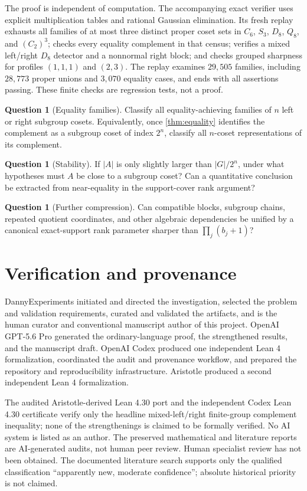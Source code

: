 \documentclass[11pt,a4paper]{amsart}
\theoremstyle{definition}
\newtheorem{question}[theorem]{Question}
\theoremstyle{remark}
\begin{document}
The proof is independent of computation.  The accompanying exact verifier uses
explicit multiplication tables and rational Gaussian elimination.  Its fresh
replay exhausts all families of at most three distinct proper coset sets in
$C_6$, $S_3$, $D_8$, $Q_8$, and $(C_2)^3$; checks every equality complement in
that census; verifies a mixed left/right $D_8$ detector and a nonnormal right
block; and checks grouped sharpness for profiles $(1,1,1)$ and $(2,3)$.  The
replay examines $29{,}505$ families, including $28{,}773$ proper unions and
$3{,}070$ equality cases, and ends with all assertions passing.  These finite
checks are regression tests, not a proof.

\begin{question}[Equality families]
Classify all equality-achieving families of $n$ left or right subgroup cosets.
Equivalently, once \cref{thm:equality} identifies the complement as a subgroup
coset of index $2^n$, classify all $n$-coset representations of its complement.
\end{question}

\begin{question}[Stability]
If $|A|$ is only slightly larger than $|G|/2^n$, under what hypotheses must $A$
be close to a subgroup coset?  Can a quantitative conclusion be extracted from
near-equality in the support-cover rank argument?
\end{question}

\begin{question}[Further compression]
Can compatible blocks, subgroup chains, repeated quotient coordinates, and
other algebraic dependencies be unified by a canonical exact-support rank
parameter sharper than $\prod_j(b_j+1)$?
\end{question}

\section*{Verification and provenance}

DannyExperiments initiated and directed the investigation, selected the problem
and validation requirements, curated and validated the artifacts, and is the
human curator and conventional manuscript author of this project.  OpenAI
GPT-5.6 Pro generated the ordinary-language proof, the strengthened results,
and the manuscript draft.  OpenAI Codex produced one independent Lean 4
formalization, coordinated the audit and provenance workflow, and prepared the
repository and reproducibility infrastructure.  Aristotle produced a second
independent Lean 4 formalization.

The audited Aristotle-derived Lean 4.30 port and the independent Codex Lean
4.30 certificate verify only the headline mixed-left/right finite-group
complement inequality; none of the strengthenings is claimed to be formally
verified.  No AI system is listed as an author.  The preserved mathematical
and literature reports are AI-generated audits, not human peer review.  Human
specialist review has not been obtained.  The documented literature search
supports only the qualified classification ``apparently new, moderate
confidence''; absolute historical priority is not claimed.

\printbibliography
\end{document}
